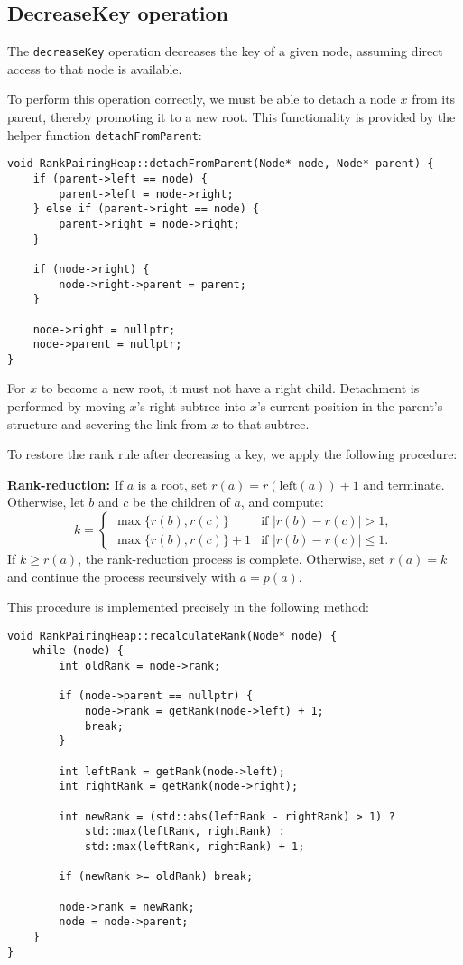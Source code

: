 \subsection{DecreaseKey operation}

The \texttt{decreaseKey} operation decreases the key of a given node, assuming direct access to that node is available.

To perform this operation correctly, we must be able to detach a node \(x\) from its parent, thereby promoting it to a new root. This functionality is provided by the helper function \texttt{detachFromParent}:

\begin{verbatim}
void RankPairingHeap::detachFromParent(Node* node, Node* parent) {
    if (parent->left == node) {
        parent->left = node->right;
    } else if (parent->right == node) {
        parent->right = node->right;
    }
    
    if (node->right) {
        node->right->parent = parent;
    }
    
    node->right = nullptr;
    node->parent = nullptr;
}
\end{verbatim}

For \(x\) to become a new root, it must not have a right child. Detachment is performed by moving \(x\)'s right subtree into \(x\)'s current position in the parent's structure and severing the link from \(x\) to that subtree.

To restore the rank rule after decreasing a key, we apply the following procedure:

\textbf{Rank-reduction:} If \(a\) is a root, set \(r(a) = r(\text{left}(a)) + 1\) and terminate. Otherwise, let \(b\) and \(c\) be the children of \(a\), and compute:
\[
k = 
\begin{cases}
\max\{r(b), r(c)\} & \text{if } |r(b) - r(c)| > 1, \\
\max\{r(b), r(c)\} + 1 & \text{if } |r(b) - r(c)| \leq 1.
\end{cases}
\]
If \(k \geq r(a)\), the rank-reduction process is complete. Otherwise, set \(r(a) = k\) and continue the process recursively with \(a = p(a)\).

This procedure is implemented precisely in the following method:

\begin{verbatim}
void RankPairingHeap::recalculateRank(Node* node) {
    while (node) {
        int oldRank = node->rank;
        
        if (node->parent == nullptr) {
            node->rank = getRank(node->left) + 1;
            break;
        }
        
        int leftRank = getRank(node->left);
        int rightRank = getRank(node->right);

        int newRank = (std::abs(leftRank - rightRank) > 1) ?
            std::max(leftRank, rightRank) :
            std::max(leftRank, rightRank) + 1;
        
        if (newRank >= oldRank) break;
        
        node->rank = newRank;
        node = node->parent;
    }
}
\end{verbatim}

